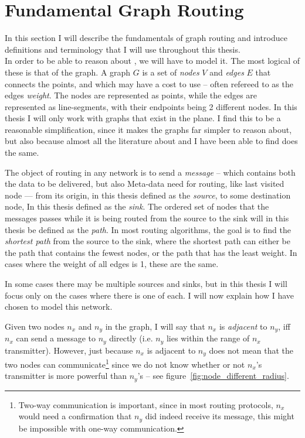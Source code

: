 \section{Fundamental Graph Routing}
\label{fundamental}
In this section I will describe the fundamentals of graph routing and introduce definitions and terminology that I will use throughout this thesis.\\

In order to be able to reason about \manet, we will have to model it. The most logical of these is that of the graph. A graph $G$ is a set of \emph{nodes} $V$ and \emph{edges} $E$ that connects the points, and which may have a cost to use -- often refereed to as the edges \emph{weight}. The nodes are represented as points, while the edges are represented as line-segments, with their endpoints being 2 different nodes. In this thesis I will only work with graphs that exist in the plane. I find this to be a reasonable simplification, since it makes the graphs far simpler to reason about, but also because almost all the literature about \manet and \anet I have been able to find does the same. 

The object of routing in any network is to send a \emph{message} -- which contains both the data to be delivered, but also Meta-data need for routing, like last visited node --- from its origin, in this thesis defined as the \emph{source}, to some destination node, In this thesis defined as the \emph{sink}. The ordered set of nodes that the messages passes while it is being routed from the source to the sink will in this thesis be defined as the \emph{path}. In most routing algorithms, the goal is to find the \emph{shortest path} from the source to the sink, where the shortest path can either be the path that contains the fewest nodes, or the path that has the least weight. In cases where the weight of all edges is 1, these are the same. 

In some cases there may be multiple sources and sinks, but in this thesis I will focus only on the cases where there is one of each. I will now explain how I have chosen to model this network. 


Given two nodes $n_x$ and $n_y$ in the graph, I will say that $n_x$ is \emph{adjacent} to $n_y$, iff $n_x$ can send a message to $n_y$ directly (i.e. $n_y$ lies within the range of $n_x$ transmitter). However, just because $n_x$ is adjacent to $n_y$ does not mean that the two nodes can communicate\footnote{Two-way communication is important, since in most routing protocols, $n_x$ would need a confirmation that $n_y$ did indeed receive its message, this might be impossible with one-way communication.} since we do not know whether or not $n_x$'s transmitter is more powerful than $n_y$'s -- see figure~\ref{fig:node_different_radius}. 

